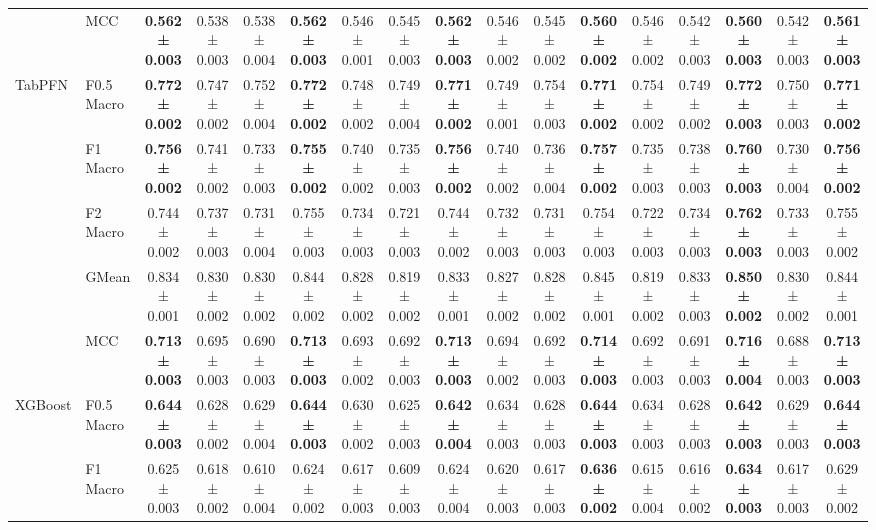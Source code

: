 \begin{table}[H]
{\begin{tabular}{llccccccccccccccc}
 & MCC & \textbf{0.562 ± 0.003} & 0.538 ± 0.003 & 0.538 ± 0.004 & \textbf{0.562 ± 0.003} & 0.546 ± 0.001 & 0.545 ± 0.003 & \textbf{0.562 ± 0.003} & 0.546 ± 0.002 & 0.545 ± 0.002 & \textbf{0.560 ± 0.002} & 0.546 ± 0.002 & 0.542 ± 0.003 & \textbf{0.560 ± 0.003} & 0.542 ± 0.003 & \textbf{0.561 ± 0.003} \\
\cline{1-17}
\multirow[t]{5}{*}{TabPFN} & F0.5 Macro & \textbf{0.772 ± 0.002} & 0.747 ± 0.002 & 0.752 ± 0.004 & \textbf{0.772 ± 0.002} & 0.748 ± 0.002 & 0.749 ± 0.004 & \textbf{0.771 ± 0.002} & 0.749 ± 0.001 & 0.754 ± 0.003 & \textbf{0.771 ± 0.002} & 0.754 ± 0.002 & 0.749 ± 0.002 & \textbf{0.772 ± 0.003} & 0.750 ± 0.003 & \textbf{0.771 ± 0.002} \\
 & F1 Macro & \textbf{0.756 ± 0.002} & 0.741 ± 0.002 & 0.733 ± 0.003 & \textbf{0.755 ± 0.002} & 0.740 ± 0.002 & 0.735 ± 0.003 & \textbf{0.756 ± 0.002} & 0.740 ± 0.002 & 0.736 ± 0.004 & \textbf{0.757 ± 0.002} & 0.735 ± 0.003 & 0.738 ± 0.003 & \textbf{0.760 ± 0.003} & 0.730 ± 0.004 & \textbf{0.756 ± 0.002} \\
 & F2 Macro & 0.744 ± 0.002 & 0.737 ± 0.003 & 0.731 ± 0.004 & 0.755 ± 0.003 & 0.734 ± 0.003 & 0.721 ± 0.003 & 0.744 ± 0.002 & 0.732 ± 0.003 & 0.731 ± 0.003 & 0.754 ± 0.003 & 0.722 ± 0.003 & 0.734 ± 0.003 & \textbf{0.762 ± 0.003} & 0.733 ± 0.003 & 0.755 ± 0.002 \\
 & GMean & 0.834 ± 0.001 & 0.830 ± 0.002 & 0.830 ± 0.002 & 0.844 ± 0.002 & 0.828 ± 0.002 & 0.819 ± 0.002 & 0.833 ± 0.001 & 0.827 ± 0.002 & 0.828 ± 0.002 & 0.845 ± 0.001 & 0.819 ± 0.002 & 0.833 ± 0.003 & \textbf{0.850 ± 0.002} & 0.830 ± 0.002 & 0.844 ± 0.001 \\
 & MCC & \textbf{0.713 ± 0.003} & 0.695 ± 0.003 & 0.690 ± 0.003 & \textbf{0.713 ± 0.003} & 0.693 ± 0.002 & 0.692 ± 0.003 & \textbf{0.713 ± 0.003} & 0.694 ± 0.002 & 0.692 ± 0.003 & \textbf{0.714 ± 0.003} & 0.692 ± 0.003 & 0.691 ± 0.003 & \textbf{0.716 ± 0.004} & 0.688 ± 0.003 & \textbf{0.713 ± 0.003} \\
\cline{1-17}
\multirow[t]{5}{*}{XGBoost} & F0.5 Macro & \textbf{0.644 ± 0.003} & 0.628 ± 0.002 & 0.629 ± 0.004 & \textbf{0.644 ± 0.003} & 0.630 ± 0.002 & 0.625 ± 0.003 & \textbf{0.642 ± 0.004} & 0.634 ± 0.003 & 0.628 ± 0.003 & \textbf{0.644 ± 0.003} & 0.634 ± 0.003 & 0.628 ± 0.003 & \textbf{0.642 ± 0.003} & 0.629 ± 0.003 & \textbf{0.644 ± 0.003} \\
 & F1 Macro & 0.625 ± 0.003 & 0.618 ± 0.002 & 0.610 ± 0.004 & 0.624 ± 0.002 & 0.617 ± 0.003 & 0.609 ± 0.003 & 0.624 ± 0.004 & 0.620 ± 0.003 & 0.617 ± 0.003 & \textbf{0.636 ± 0.002} & 0.615 ± 0.004 & 0.616 ± 0.002 & \textbf{0.634 ± 0.003} & 0.617 ± 0.003 & 0.629 ± 0.002 \\

\end{tabular}}
\end{table}
